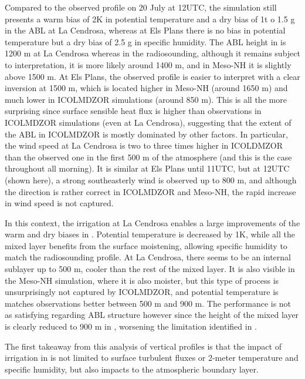 \hfill

Compared to the observed profile on 20 July at 12UTC, the \noirr simulation still presents a warm bias of 2K in potential temperature and a dry bias of 1t o 1.5 g \perkg in the ABL at La Cendrosa, whereas at Els Plans there is no bias in potential temperature but a dry bias of 2.5 g \perkg in specific humidity. 
The ABL height in \noirr is 1200 m at La Cendrosa whereas in the radiosounding, although it remains subject to interpretation, it is more likely around 1400 m, and in Meso-NH it is slightly above 1500 m.
At Els Plans, the observed profile is easier to interpret with a clear inversion at 1500 m, which is located higher in Meso-NH (around 1650 m) and much lower in ICOLMDZOR simulations (around 850 m). 
This is all the more surprising since surface sensible heat flux is higher than observations in ICOLMDZOR simulations (even \irrboost at La Cendrosa), suggesting that the extent of the ABL in ICOLMDZOR is mostly dominated by other factors. %
In particular, the wind speed at La Cendrosa is two to three times higher in ICOLDMZOR than the observed one in the first 500 m of the atmosphere (and this is the case throughout all morning).%
It is similar at Els Plans until 11UTC, but at 12UTC (shown here), a strong southeasterly wind is observed up to 800 m, and although the direction is rather correct in ICOLMDZOR and Meso-NH, the rapid increase in wind speed is not captured.

In this context, the irrigation at La Cendrosa enables a large improvements of the warm and dry biases in \irrboost. Potential temperature is decreased by 1K, while all the mixed layer benefits from the surface moistening, allowing specific humidity to match the radiosounding profile. 
At La Cendrosa, there seems to be an internal sublayer up to 500 m, cooler than the rest of the mixed layer. It is also visible in the Meso-NH simulation, where it is also moister, but this type of process is unsurprisingly not captured by ICOLMDZOR, and potential temperature is matches observations better between 500 m and 900 m.
The performance is not as satisfying regarding ABL structure however since the height of the mixed layer is clearly reduced to 900 m in \irrboost, worsening the limitation identified in \noirr. 


\hfill

The first takeaway from this analysis of vertical profiles is that the impact of irrigation in \irrboost is not limited to surface turbulent fluxes or 2-meter temperature and specific humidity, but also impacts to the atmospheric boundary layer.

